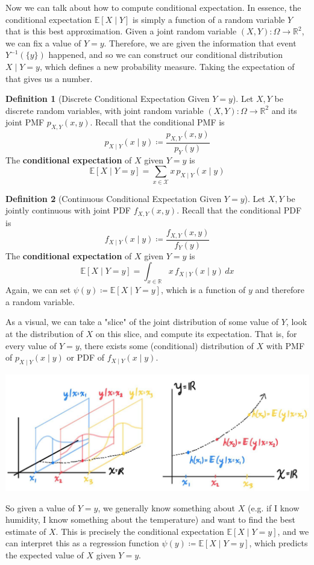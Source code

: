 \documentclass{article}
\theoremstyle{definition}
\theoremstyle{remark}
\theoremstyle{definition}
\newtheorem{definition}{Definition}[section]
\begin{document}
Now we can talk about how to compute conditional expectation. In essence, the conditional expectation $\mathbb{E}[X \mid Y]$ is simply a function of a random variable $Y$ that is this best approximation. Given a joint random variable $(X, Y): \Omega \rightarrow \mathbb{R}^2$, we can fix a value of $Y = y$. Therefore, we are given the information that event $Y^{-1}(\{y\})$ happened, and so we can construct our conditional distribution $X \mid Y = y$, which defines a new probability measure. Taking the expectation of that gives us a number. 


\begin{definition}[Discrete Conditional Expectation Given $Y = y$]
Let $X, Y$ be discrete random variables, with joint random variable $(X, Y): \Omega \rightarrow \mathbb{R}^2$ and its joint PMF $p_{X, Y} (x, y)$. Recall that the conditional PMF is 
\[p_{X\mid Y}(x \mid y) \coloneqq \frac{p_{X, Y} (x, y)}{p_Y (y)}\]
The \textbf{conditional expectation} of $X$ given $Y = y$ is 
\[\mathbb{E}[X \mid Y = y] = \sum_{x \in \mathcal{X}} x \, p_{X \mid Y} (x \mid y)\]
\end{definition}

\begin{definition}[Continuous Conditional Expectation Given $Y = y$]
Let $X, Y$ be jointly continuous with joint PDF $f_{X, Y} (x, y)$. Recall that the conditional PDF is 
\[f_{X \mid Y} (x \mid y) \coloneqq \frac{f_{X, Y} (x, y)}{f_Y (y)}\]
The \textbf{conditional expectation} of $X$ given $Y = y$ is 
\[\mathbb{E}[X \mid Y = y] = \int_{x \in \mathbb{R}} x \, f_{X \mid Y} (x \mid y) \, dx\]
Again, we can set $\psi(y) \coloneqq \mathbb{E}[X \mid Y = y]$, which is a function of $y$ and therefore a random variable. 
\end{definition}

As a visual, we can take a "slice" of the joint distribution of some value of $Y$, look at the distribution of $X$ on this slice, and compute its expectation. That is, for every value of $Y = y$, there exists some (conditional) distribution of $X$ with PMF of $p_{X \mid Y} (x \mid y)$ or PDF of $f_{X \mid Y} (x \mid y)$. 
\begin{center}
    \includegraphics[scale=0.3]{img/conditional_exp.jpg}
\end{center}
So given a value of $Y = y$, we generally know something about $X$ (e.g. if I know humidity, I know something about the temperature) and want to find the best estimate of $X$. This is precisely the conditional expectation $\mathbb{E}[X \mid Y = y]$, and we can interpret this as a regression function $\psi(y) \coloneqq \mathbb{E}[X \mid Y = y]$, which predicts the expected value of $X$ given $Y = y$. 
\end{document}
